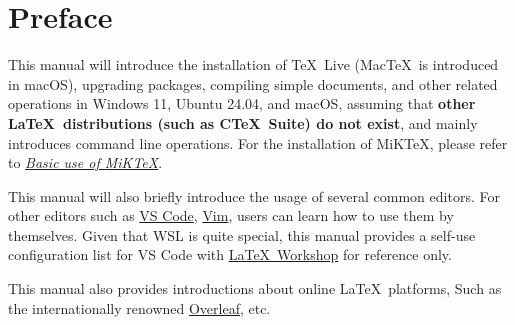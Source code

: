 
\chapter*{Preface}

This manual will introduce the installation of \TeX~Live
(Mac\TeX\ is introduced in macOS), upgrading packages,
compiling simple documents, and other related operations in Windows 11,
Ubuntu 24.04, and macOS, assuming that
\textbf{other \LaTeX\ distributions (such as C\TeX\ Suite) do not exist},
and mainly introduces command line operations.
For the installation of MiK\TeX, please refer to
\href{https://camusecao.top/2021-06-16/MiKTeX/}{\emph{Basic use of \textup{MiK\TeX}}}.

This manual will also briefly introduce the usage of several common editors.
For other editors such as \href{https://code.visualstudio.com/}{VS Code},
\href{https://www.vim.org/}{Vim}, users can learn how to use them by themselves.
Given that WSL is quite special,
this manual provides a self-use configuration list for VS Code with
\href{https://marketplace.visualstudio.com/items?itemName=James-Yu.latex-workshop}{\LaTeX\ Workshop}
for reference only.

This manual also provides introductions about online \LaTeX\ platforms,
Such as the internationally renowned
\href{http://www.overleaf.com/}{Overleaf}, etc.

